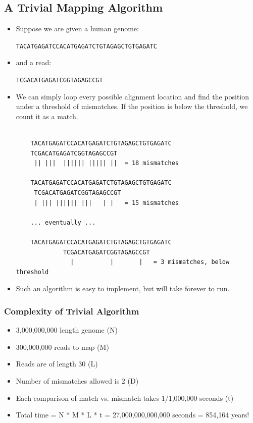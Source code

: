 \documentclass[10pt]{article}
\begin{document}
\subsection*{A Trivial Mapping Algorithm}
\begin{itemize}
    \item Suppose we are given a human genome:
    \begin{center}
    \texttt{TACATGAGATCCACATGAGATCTGTAGAGCTGTGAGATC}
    \end{center}
    \item and a read:
    \begin{center}
    \texttt{TCGACATGAGATCGGTAGAGCCGT}
    \end{center}
    \item We can simply loop every possible alignment location and find the position under a threshold of mismatches.  If the position is below the threshold, we count it as a match.
    \begin{verbatim}
    
    TACATGAGATCCACATGAGATCTGTAGAGCTGTGAGATC
    TCGACATGAGATCGGTAGAGCCGT
     || |||  |||||| ||||| ||  = 18 mismatches

    TACATGAGATCCACATGAGATCTGTAGAGCTGTGAGATC
     TCGACATGAGATCGGTAGAGCCGT
     | ||| |||||| |||   | |   = 15 mismatches

    ... eventually ...

    TACATGAGATCCACATGAGATCTGTAGAGCTGTGAGATC
             TCGACATGAGATCGGTAGAGCCGT
               |          |       |   = 3 mismatches, below threshold
    \end{verbatim}
    \item Such an algorithm is easy to implement, but will take forever to run.
\end{itemize}
\subsubsection*{Complexity of Trivial Algorithm}
\begin{itemize}
    \item 3,000,000,000 length genome (N)
    \item 300,000,000 reads to map (M)
    \item Reads are of length 30 (L)
    \item Number of mismatches allowed is 2 (D)
    \item Each comparison of match vs. mismatch takes 1/1,000,000 seconds (t)
    \item Total time = N * M * L * t = 27,000,000,000,000 seconds = 854,164 years!
\end{itemize}
\end{document}

